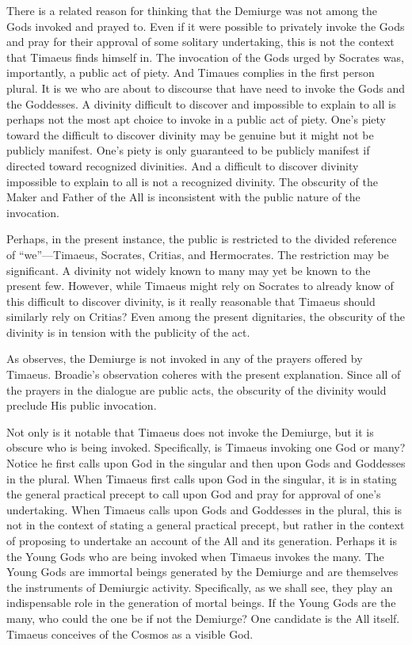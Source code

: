 There is a related reason for thinking that the Demiurge was not among the Gods invoked and prayed to. Even if it were possible to privately invoke the Gods and pray for their approval of some solitary undertaking, this is not the context that Timaeus finds himself in. The invocation of the Gods urged by Socrates was, importantly, a public act of piety. And Timaues complies in the first person plural. It is we who are about to discourse that have need to invoke the Gods and the Goddesses. A divinity difficult to discover and impossible to explain to all is perhaps not the most apt choice to invoke in a public act of piety. One's piety toward the difficult to discover divinity may be genuine but it might not be publicly manifest. One's piety is only guaranteed to be publicly manifest if directed toward recognized divinities. And a difficult to discover divinity impossible to explain to all is not a recognized divinity. The obscurity of the Maker and Father of the All is inconsistent with the public nature of the invocation.

Perhaps, in the present instance, the public is restricted to the divided reference of ``we''---Timaeus, Socrates, Critias, and Hermocrates. The restriction may be significant. A divinity not widely known to many may yet be known to the present few. However, while Timaeus might rely on Socrates to already know of this difficult to discover divinity, is it really reasonable that Timaeus should similarly rely on Critias? Even among the present dignitaries, the obscurity of the divinity is in tension with the publicity of the act.

As \citet[]{Broadie:2012vl} observes, the Demiurge is not invoked in any of the prayers offered by Timaeus. Broadie's observation coheres with the present explanation. Since all of the prayers in the dialogue are public acts, the obscurity of the divinity would preclude His public invocation.

Not only is it notable that Timaeus does not invoke the Demiurge, but it is obscure who is being invoked. Specifically, is Timaeus invoking one God or many? Notice he first calls upon God in the singular and then upon Gods and Goddesses in the plural. When Timaeus first calls upon God in the singular, it is in stating the general practical precept to call upon God and pray for approval of one's undertaking. When Timaeus calls upon Gods and Goddesses in the plural, this is not in the context of stating a general practical precept, but rather in the context of proposing to undertake an account of the All and its generation. Perhaps it is the Young Gods who are being invoked when Timaeus invokes the many. The Young Gods are immortal beings generated by the Demiurge and are themselves the instruments of Demiurgic activity. Specifically, as we shall see, they play an indispensable role in the generation of mortal beings. If the Young Gods are the many, who could the one be if not the Demiurge? One candidate is the All itself. Timaeus conceives of the Cosmos as a visible God. 


